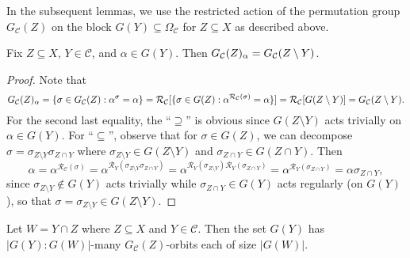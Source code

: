 In the subsequent lemmas, we use the restricted action of the permutation group $G_\mathcal{C}(Z)$ on the block $G(Y) \subseteq \Omega_\mathcal{C}$ for $Z \subseteq X$ as described above.

\begin{lemma}\label{lem:blaha_elem_stabiliser}
    Fix $Z \subseteq X$,  $Y \in \mathcal{C}$, and $\alpha \in G(Y)$. Then $\added{2}{G_\mathcal{C}(Z)_\alpha} = G_\mathcal{C}(Z \setminus Y)$.
\end{lemma}

\begin{proof}
    Note that
    $$\added{2}{G_\mathcal{C}(Z)_\alpha} = \{\sigma \in G_\mathcal{C}(Z) : \alpha^\sigma = \alpha\} = \mathcal{R}_\mathcal{C}[\{\sigma \in G(Z) : \alpha^{\mathcal{R}_\mathcal{C}(\sigma)} = \alpha\}] = \mathcal{R}_\mathcal{C}[G(Z \setminus Y)] = G_\mathcal{C}(Z \setminus Y).$$
    For the second last equality, the ``$\supseteq$'' is obvious since $G(Z \setminus Y)$ acts trivially on $\alpha \in G(Y)$. For ``$\subseteq$'', observe that for $\sigma \in G(Z)$, we can decompose $\sigma = \sigma_{Z \setminus Y} \sigma_{Z \cap Y}$ where $\sigma_{Z \setminus Y} \in G(Z \setminus Y)$ and $\sigma_{Z \cap Y} \in G(Z \cap Y)$. Then
    $$\alpha = \alpha^{\mathcal{R}_\mathcal{C}(\sigma)} = \alpha^{\mathcal{R}_Y(\sigma_{Z \setminus Y} \sigma_{Z \cap Y})} = \alpha^{\mathcal{R}_Y(\sigma_{Z \setminus Y})\mathcal{R}_Y(\sigma_{Z \cap Y})} = \alpha^{\mathcal{R}_Y(\sigma_{Z \cap Y})} = \alpha\sigma_{Z \cap Y},$$
     since $\sigma_{Z \setminus Y} \not\in G(Y)$ acts trivially while $\sigma_{Z \cap Y} \in G(Y)$ acts regularly (on $G(Y)$), so that $\sigma = \sigma_{Z \setminus Y} \in G(Z \setminus Y)$.
\end{proof}

\begin{lemma}\label{lem:blaha_elem_orbits_size}
    Let $W = Y \cap Z$ where $Z \subseteq X$ and $Y \in \mathcal{C}$. Then the set $G(Y)$ has $|G(Y) : G(W)|$-many $G_\mathcal{C}(Z)$-orbits each of size $|G(W)|$.
\end{lemma}

